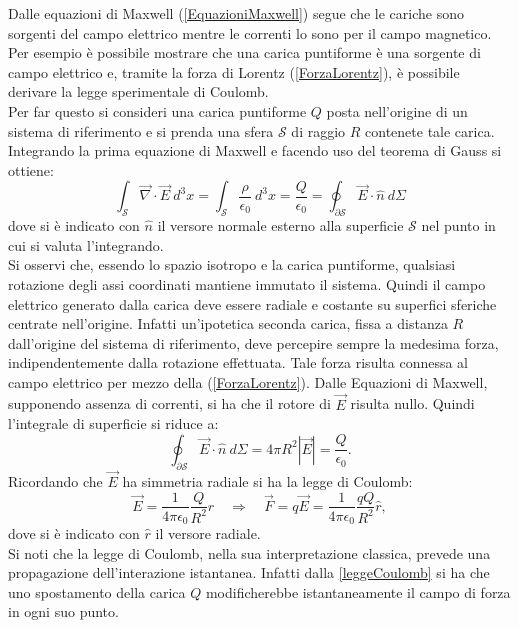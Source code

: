 Dalle equazioni di Maxwell (\ref{EquazioniMaxwell}) segue che le cariche sono sorgenti del campo 
elettrico mentre le correnti lo sono per 
il campo magnetico. Per esempio è possibile mostrare che una carica puntiforme è una sorgente di campo elettrico e, 
tramite la forza di Lorentz (\ref{ForzaLorentz}), è possibile derivare la legge sperimentale di Coulomb.\\
Per far questo si consideri una carica puntiforme $Q$ posta nell'origine di un sistema di riferimento e si prenda una sfera $\mathcal{S}$ di raggio $R$ 
contenete tale carica. Integrando la prima equazione di Maxwell e facendo uso del teorema di Gauss si ottiene:
\begin{equation*}
	\int_\mathcal{S}\vec{\nabla}\cdot\vec{E}\ d^3x=\int_\mathcal{S}\frac{\rho}{\epsilon_0}\ d^3x=\frac{Q}{\epsilon_0}=\oint_{\partial\mathcal{S}}\vec{E}\cdot\hat{n}\ d\Sigma
\end{equation*}
dove si è indicato con $\hat{n}$ il versore normale esterno alla superficie $\mathcal{S}$ nel punto in cui si valuta l'integrando.\\
Si osservi che, essendo lo spazio 
isotropo e la carica puntiforme, qualsiasi rotazione degli assi coordinati mantiene immutato il sistema. Quindi
il campo elettrico generato dalla carica deve essere radiale e costante su superfici sferiche centrate nell'origine. Infatti un'ipotetica seconda carica, 
fissa a distanza $R$ dall'origine del sistema di riferimento, deve percepire sempre la medesima forza, indipendentemente dalla rotazione effettuata.
Tale forza risulta connessa al campo elettrico per mezzo della (\ref{ForzaLorentz}). Dalle Equazioni di Maxwell, supponendo assenza di correnti, 
si ha che il rotore di $\vec{E}$ risulta nullo. Quindi l'integrale di superficie si riduce a:
\begin{equation*}
	\oint_{\partial\mathcal{S}}\vec{E}\cdot\hat{n}\ d\Sigma=4\pi R^2|\vec{E}|=\frac{Q}{\epsilon_0}.
\end{equation*}	
Ricordando che $\vec{E}$ ha simmetria radiale si ha la legge di Coulomb:
\begin{equation}
	\vec{E}=\frac{1}{4\pi\epsilon_0}\frac{Q}{R^2}\hat{r} \quad \Rightarrow \quad \vec{F}=q\vec{E}=\frac{1}{4\pi\epsilon_0}\frac{qQ}{R^2}\hat{r},\label{leggeCoulomb}
\end{equation} 
dove si è indicato con $\hat{r}$ il versore radiale.\\
Si noti che la legge di Coulomb, nella sua interpretazione classica, prevede una propagazione dell'interazione istantanea. Infatti dalla \eqref{leggeCoulomb} si ha che uno spostamento della carica $Q$ modificherebbe istantaneamente il campo di forza in ogni suo punto.\\

